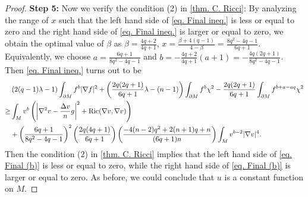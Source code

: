 \documentclass[12pt]{amsart}
\numberwithin{equation}{section}
\numberwithin{lemma}{section}
\numberwithin{proposition}{section}
\numberwithin{corollary}{section}
\numberwithin{remark}{section}
\begin{document}
\begin{proof}
    \textbf{Step 5:} Now we verify the condition (2) in \cref{thm. C. Ricci}: By analyzing the range of $x$ such that the left hand side of \cref{eq. Final ineq.} is less or equal to zero and the right hand side of \cref{eq. Final ineq.} is larger or equal to zero, we obtain the optimal value of $\beta$ as $\beta=\frac{4q+2}{4q+1}$, $x=\frac{\beta+4(q-1)}{4-\beta}=\frac{8q^2-4q-1}{6q+1}$. Equivalently, we choose $a=\frac{6q+1}{8q^2-4q-1}$ and $b=-\frac{4q+2}{4q+1}(a+1)=-\frac{4q(2q+1)}{8q^2-4q-1}$. Then \cref{eq. Final ineq.} turns out to be
    \begin{align}\label{eq. Final (b)}
        &\left(2(q-1)\lambda-1\right)
        \int_{\partial M}f^b|\nabla f|^2
        +\left(\frac{2q(2q+1)}{6q+1}\lambda-(n-1)\right)
        \int_{\partial M}f^b\chi^2
        -\frac{2q(2q+1)}{6q+1}\int_{\partial M}f^{b+a-aq}\chi^2\notag\\
        \geq & \int_M v^b\left(
        \left|\nabla^2 v-\frac{\Delta v}{n}g\right|^2
        +\mathrm{Ric}(\nabla v,\nabla v)
        \right)\notag\\
        &+\left(\frac{6q+1}{8q^2-4q-1}\right)^2
        \left(\frac{2q(4q+1)}{6q+1}\right)
        \left(
        \frac{-4(n-2)q^2+2(n+1)q+n}{(6q+1)n}
        \right)
        \int_M v^{b-2}|\nabla v|^4.
    \end{align}
    Then the condition (2) in \cref{thm. C. Ricci} implies that the left hand side of \cref{eq. Final (b)} is less or equal to zero, while the right hand side of \cref{eq. Final (b)} is larger or equal to zero. As before, we could conclude that $u$ is a constant function on $M$.
\end{proof}
\end{document}

